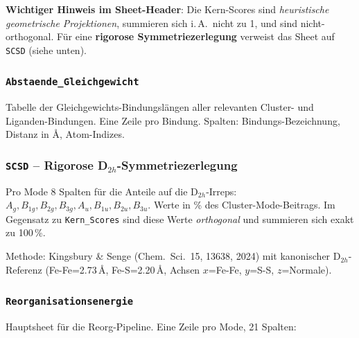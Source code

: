 \documentclass[11pt,a4paper,twoside]{article}
\providecommand{\angstrom}{\text{\AA}}    %
\theoremstyle{remark}
\begin{document}
\textbf{Wichtiger Hinweis im Sheet-Header}: Die Kern-Scores sind
\emph{heuristische geometrische Projektionen}, summieren sich
i.\,A.\ nicht zu 1, und sind nicht-orthogonal. F\"ur eine
\textbf{rigorose Symmetriezerlegung} verweist das Sheet auf
\texttt{SCSD} (siehe unten).

\subsubsection*{\texttt{Abstaende\_Gleichgewicht}}

Tabelle der Gleichgewichts-Bindungsl\"angen aller relevanten
Cluster- und Liganden-Bindungen. Eine Zeile pro Bindung. Spalten:
Bindungs-Bezeichnung, Distanz in $\angstrom$, Atom-Indizes.

\subsubsection*{\texttt{SCSD} -- Rigorose D$_{2h}$-Symmetriezerlegung}

Pro Mode 8 Spalten f\"ur die Anteile auf die D$_{2h}$-Irreps:
$A_g, B_{1g}, B_{2g}, B_{3g}, A_u, B_{1u}, B_{2u}, B_{3u}$. Werte
in \% des Cluster-Mode-Beitrags. Im Gegensatz zu \texttt{Kern\_Scores}
sind diese Werte \emph{orthogonal} und summieren sich exakt zu 100\,\%.

Methode: Kingsbury \& Senge (Chem.\ Sci.\ 15, 13638, 2024) mit
kanonischer D$_{2h}$-Referenz (Fe-Fe=2.73\,$\angstrom$,
Fe-S=2.20\,$\angstrom$, Achsen $x$=Fe-Fe, $y$=S-S, $z$=Normale).

\subsubsection*{\texttt{Reorganisationsenergie}}
\label{app:sheet-reorg}

Hauptsheet f\"ur die Reorg-Pipeline. Eine Zeile pro Mode, 21 Spalten:
\end{document}
